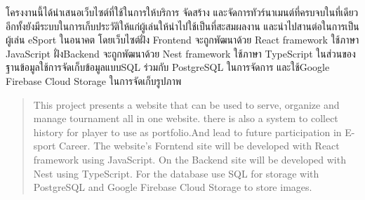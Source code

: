 \maketitle
\makesignature

\ifproject
\begin{abstractTH}


โครงงานนี้ได้นําเสนอเว็บไซต์ที่ใช้ในการให้บริการ จัดสร้าง และจัดการทัวร์นาเมนต์ที่ครบจบในที่เดียว 
อีกทั้งยังมีระบบในการเก็บประวัติให้แก่ผู้เล่นให้นําไปใช้เป็นที่สะสมผลงาน และนําไปสานต่อในการเป็นผู้เล่น eSport ในอนาคต โดยเว็บไซต์ฝั่ง Frontend จะถูกพัฒนาด้วย React framework ใช้ภาษา JavaScript 
ฝั่งBackend จะถูกพัฒนาด้วย Nest framework ใช้ภาษา TypeScript ในส่วนของฐานข้อมูลใช้การจัดเก็บข้อมูลแบบSQL ร่วมกับ PostgreSQL ในการจัดการ และใช้Google Firebase Cloud Storage 
ในการจัดเก็บรูปภาพ
\end{abstractTH}

\begin{abstract}


    This project presents a website that can be used to serve, organize and manage tournament all in one website. there is also a system to collect history for player to use as portfolio.And lead to future participation in E-sport Career. 
The website's Forntend site will be developed with React framework using JavaScript. 
On the Backend site will be developed with Nest using TypeScript.
For the database use SQL for storage with PostgreSQL and Google Firebase Cloud Storage to store images.
\end{abstract}





\contentspage

\ifproject
\figurelistpage

\tablelistpage
\fi %



